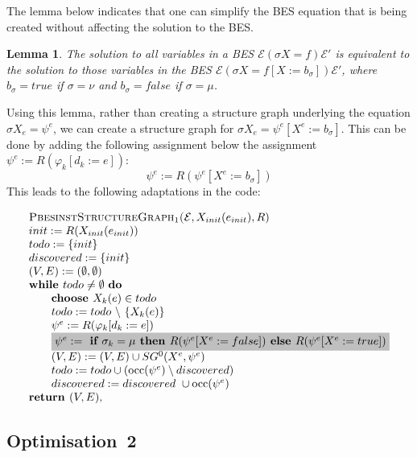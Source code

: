 \documentclass{article}
\newtheorem{lemma}[theorem]{Lemma}
\newcommand{\Return}{\text{\textbf{return }}}
\begin{document}
The lemma below indicates that one can simplify the BES equation that is being created
without affecting the solution to the BES. 
\begin{lemma}
The solution to all variables in a BES $\mathcal{E} (\sigma X = f) \mathcal{E}'$ is 
equivalent to the solution to those variables in the BES
$\mathcal{E} (\sigma X = f[X := b_\sigma]) \mathcal{E}'$, where
$b_\sigma = true$ if $\sigma = \nu$ and $b_\sigma = false$ if $\sigma = \mu$.
\end{lemma}
Using this lemma, rather than creating a structure graph underlying the
equation $\sigma X_e = \psi^e$, we can create a structure graph
for $\sigma X_e = \psi^e[X^e := b_\sigma]$.
This can be done by adding the following assignment below the assignment
$\psi^e := R(\varphi_k[d_k := e])$:
\[
\psi^e := R(\psi^e[X^e := b_\sigma])
\]
This leads to the following adaptations in the code:

\begin{equation*}
\begin{array}{l}
\textsc{PbesinstStructureGraph$_1$(}\mathcal{E}, X_{init}(e_{init}), R) \\ 
init:=R(X_{init}(e_{init})) \\
todo:=\{init\} \\
discovered:=\{init\} \\
(V,E) :=(\emptyset ,\emptyset ) \\ 
\text{\textbf{while }}todo\neq \emptyset \text{ \textbf{do}} \\ 
\qquad \text{\textbf{choose }}X_{k}(e)\in todo \\ 
\qquad todo:=todo\ \backslash \ \{X_{k}(e)\} \\
\qquad \psi ^{e}:=R(\varphi _{k}[d_{k}:=e]) \\ 
\qquad \colorbox{lightgray}{$%
\psi^e := \textbf{ if } \sigma_k = \mu \textbf{ then } R(\psi^e[X^e := false]) \textbf{ else }  R(\psi^e[X^e := true]) $}\\
\qquad (V,E) := (V,E) \cup SG^{0}(X^{e},\psi ^{e}) \\ 
\qquad todo:=todo\cup (\mathrm{occ}(\psi ^{e})\setminus discovered) \\
\qquad discovered:=discovered\ \cup \mathrm{occ}(\psi ^{e}) \\
\Return (V, E),%
\end{array}%
\end{equation*}%


\subsection{Optimisation~2}
\end{document}
